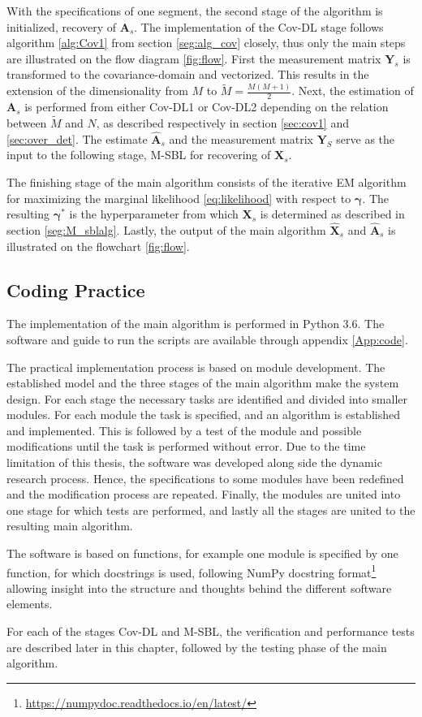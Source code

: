 With the specifications of one segment, the second stage of the algorithm is initialized, recovery of $\mathbf{A}_s$.
The implementation of the Cov-DL stage follows algorithm \ref{alg:Cov1} from section \ref{seg:alg_cov} closely, thus only the main steps are illustrated on the flow diagram \ref{fig:flow}.
First the measurement matrix $\mathbf{Y}_s$ is transformed to the covariance-domain and vectorized. This results in the extension of the dimensionality from $M$ to $\widetilde{M} = \frac{M(M+1)}{2}$.
Next, the estimation of $\mathbf{A}_s$ is performed from either Cov-DL1 or Cov-DL2 depending on the relation between $\widetilde{M}$ and $N$, as described respectively in section \ref{sec:cov1} and \ref{sec:over_det}.
The estimate $\hat{\mathbf{A}}_s$ and the measurement matrix $\mathbf{Y}_S$ serve as the input to the following stage, M-SBL for recovering of $\mathbf{X}_s$. 

The finishing stage of the main algorithm consists of the iterative EM algorithm for maximizing the marginal likelihood \eqref{eq:likelihood} with respect to $\boldsymbol{\gamma}$. The resulting $\boldsymbol{\gamma}^{\ast}$ is the hyperparameter from which $\mathbf{X}_s$ is determined as described in section \ref{seg:M_sblalg}. 
Lastly, the output of the main algorithm $\hat{\mathbf{X}}_s$ and $\hat{\mathbf{A}}_s$ is illustrated on the flowchart \ref{fig:flow}.

\subsection{Coding Practice}
The implementation of the main algorithm is performed in Python 3.6. The software and guide to run the scripts are available through appendix \ref{App:code}.

The practical implementation process is based on module development. 
The established model and the three stages of the main algorithm make the system design. 
For each stage the necessary tasks are identified and divided into smaller modules. 
For each module the task is specified, and an algorithm is established and implemented. 
This is followed by a test of the module and possible modifications until the task is performed without error. 
Due to the time limitation of this thesis, the software was developed along side the dynamic research process. 
Hence, the specifications to some modules have been redefined and the modification process are repeated. 
Finally, the modules are united into one stage for which tests are performed, and lastly all the stages are united to the resulting main algorithm.

The software is based on functions, for example one module is specified by one function, for which docstrings is used, following NumPy docstring format\footnote{\url{https://numpydoc.readthedocs.io/en/latest/}} allowing insight into the structure and thoughts behind the different software elements.

For each of the stages Cov-DL and M-SBL,  the verification and performance tests are described later in this chapter, followed by the testing phase of the main algorithm. 
